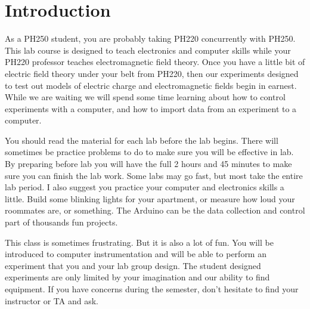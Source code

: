 \chapter{Introduction}

As a PH250 student, you are probably taking PH220 concurrently with PH250. This lab course is designed to teach electronics and computer skills while your PH220 professor teaches electromagnetic field theory. Once you have a little bit of electric field theory under your belt from PH220, then our experiments designed to test out models of electric charge and electromagnetic fields begin in earnest. While we are waiting we will spend some time learning about how to control experiments with a computer, and how to import data from an experiment to a computer.

You should read the material for each lab before the lab begins. There will sometimes be practice problems to do to make sure you will be effective in lab. By preparing before lab you will have the full 2 hours and 45 minutes to make sure you can finish the lab work. Some labs may go fast, but most take the entire lab period. I also suggest you practice your computer and electronics skills a little. Build some blinking lights for your apartment, or measure how loud your roommates are, or something. The Arduino can be the data collection and control part of thousands fun projects.

This class is sometimes frustrating. But it is also a lot of fun. You will be introduced to computer instrumentation and will be able to perform an experiment that you and your lab group design. The student designed experiments are only limited by your imagination and our ability to find equipment. If you have concerns during the semester, don't hesitate to find your instructor or TA and ask. 
